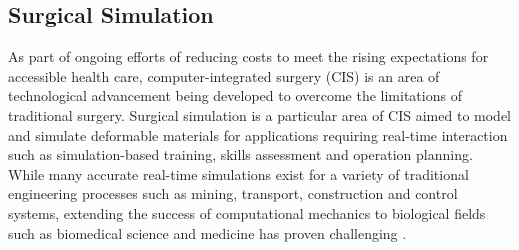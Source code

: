 \begin{comment}


Meshless models for simulating materials

Homogenous Materials:
Brain Deformations: https://www.sciencedirect.com/science/article/pii/S002192900600090X

Meshless Lagrangian explicit dynamics algorithm:
http://isml.ecm.uwa.edu.au/ISML/Publication/pdfs/2010hortonmillerIJfNMiBEmeshless.pdf

Volume rendering consists of techniques for 3D surface construction.

Non linear methods:
Moving least squared: http://www.cs.utah.edu/~csilva/courses/cpsc7960/pdf/lancaster-salkauskas-mls.pdf

Total Lagrangian explicit dynamics finite element algorithm for computing soft tissue deformation, 2006

Patient-specific model of brain deformation: Application to medical image registration, 2007

Open-source platforms for navigated image-guided interventions, 2016

(Hyper)-graphical models in biomedical image analysis, 2016


Camera tracking objects is bad, handling occlusions is problematic


Total Lagrangian explicit dynamics finite element algorithm for computing soft tissue deformation \cite{Miller2007}

Patient-specific model of brain deformation: Application to medical image registration
\cite{Wittek2007}

A meshless Total Lagrangian explicit dynamics algorithm for surgical simulation
\cite{Horton2010}

\end{comment}

\subsection{Surgical Simulation}

As part of ongoing efforts of reducing costs to meet the rising expectations for accessible health care, computer-integrated surgery (CIS) is an area of technological advancement being developed to overcome the limitations of traditional surgery. Surgical simulation is a particular area of CIS aimed to model and simulate deformable materials for applications requiring real-time interaction such as simulation-based training, skills assessment and operation planning.\cite{Miller2007} While many accurate real-time simulations exist for a variety of traditional engineering processes such as mining, transport, construction and control systems, extending the success of computational mechanics to biological fields such as biomedical science and medicine has proven challenging \cite{TinsleyOden2003}.

